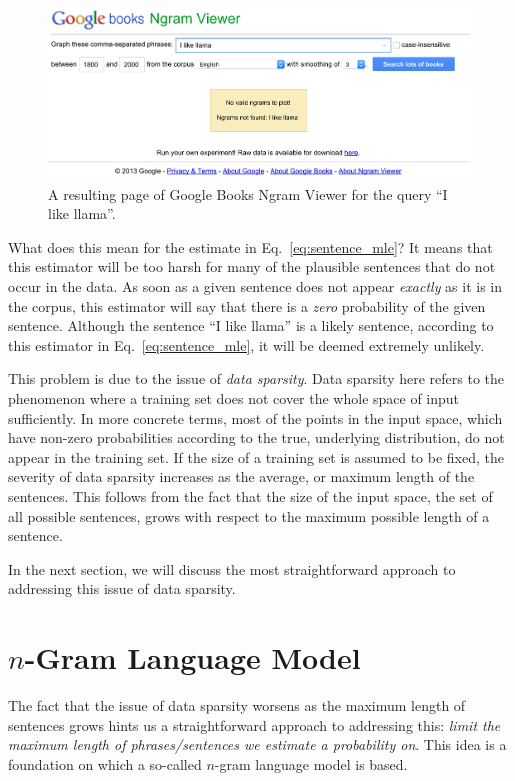 \documentclass{report}
\begin{document}
\begin{figure}[ht]
    \centering
    \includegraphics[width=\textwidth]{figures/ngram_fail.png}
    \caption{A resulting page of Google Books Ngram Viewer for the query ``I
    like llama''.}
    \label{fig:ngram_fail}
\end{figure}

What does this mean for the estimate in Eq.~\eqref{eq:sentence_mle}? It means
that this estimator will be too harsh for many of the plausible sentences that
do not occur in the data. As soon as a given sentence does not appear {\em
exactly} as it is in the corpus, this estimator will say that there is a {\em
zero} probability of the given sentence. Although the sentence ``I like llama''
is a likely sentence, according to this estimator in
Eq.~\eqref{eq:sentence_mle}, it will be deemed extremely unlikely.

This problem is due to the issue of {\em data sparsity}. Data sparsity here
refers to the phenomenon where a training set does not cover the whole space of
input sufficiently. In more concrete terms, most of the points in the input
space, which have non-zero probabilities according to the true, underlying
distribution, do not appear in the training set. If the size of a training set
is assumed to be fixed, the severity of data sparsity increases as the average,
or maximum length of the sentences. This follows from the fact that the size of
the input space, the set of all possible sentences, grows with respect to the
maximum possible length of a sentence.

In the next section, we will discuss the most straightforward approach to
addressing this issue of data sparsity.

\section{$n$-Gram Language Model}
\label{sec:n_gram_lm}

The fact that the issue of data sparsity worsens as the maximum length of
sentences grows hints us a straightforward approach to addressing this: {\em
limit the maximum length of phrases/sentences we estimate a probability on}.
This idea is a foundation on which a so-called $n$-gram language model is based.
\end{document}
